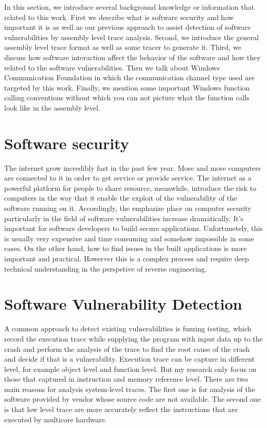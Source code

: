 \label{chapter:Bac}
In this section, we introduce several background knowledge or information that related to this work. First we describe what is software security and how important it is as well as our previous approach to assist detection of software vulnerabilities by assembly level trace analysis. Second, we introduce the general assembly level trace format as well as some tracer to generate it. Third, we discuss how software interaction affect the behavior of the software and how they related to the software vulnerabilities. Then we talk about Windows Communication Foundation in which the communication channel type used are targeted by this work. Finally, we mention some important Windows function calling conventions without which you can not picture what the function calls look like in the assembly level.
\section{Software security}
The internet grow incredibly fast in the past few year. More and more computers are connected to it in order to get service or provide service. The internet as a powerful platform for people to share resource, meanwhile, introduce the risk to computers in the way that it enable the exploit of the vulnerability of the software running on it. Accordingly, the emphasize place on computer security particularly in the field of software vulnerabilities increase dramatically. It's important for software developers to build secure applications. Unfortunetely, this is usually very expensive and time consuming and somehow impossible in some cases. On the other hand, how to find issues in the built applications is more important and practical. Howerver this is a complex process and require deep technical understanding in the perspetive of reverse engineering\cite{dowd_art_2006}.


\section{Software Vulnerability Detection}
A common approach to detect existing vulnerabilities is fuzzing testing, which record the execution trace while supplying the program with input data up to the crash and perform the analysis of the trace to find the root cause of the crash and decide if that is a vulnerability\cite{cleary_reconstructing_2013}. Execution trace can be capture in different level, for example object level and function level. But my research only focus on those that captured in instruction and memory reference level. There are two main reasons for analysis system-level traces. The first one is for analysis of the software provided by vendor whose source code are not available. The second one is that low level trace are more accurately reflect the instructions that are executed by multicore hardware\cite{wang_predicting_2011}.

